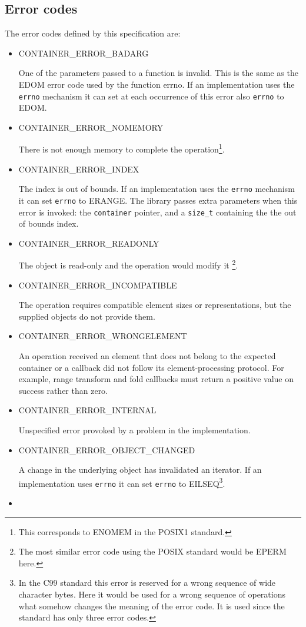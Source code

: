 \documentclass[12pt,a4paper,openany]{memoir} %
\newif\iftth
\newcommand{\doerror}[1]{%
\par\noindent
\iftth
{CONTAINER\_ERROR\_#1}
\else
{\footnotesize CONTAINER\_ERROR\_#1}
\fi
}
\begin{document}
\subsection{Error codes}
\label{errorcodes} 
The error codes defined by this specification are:
\begin{itemize}
\item
\doerror{BADARG} One of the parameters passed to a function is invalid. This is the same as the {\footnotesize EDOM} error code used by the function errno. If an implementation uses the \texttt{errno} mechanism it can set at each occurrence of this error also \texttt{errno} to {\footnotesize EDOM}.
\item
\doerror{NOMEMORY} There is not enough memory to complete the operation\footnote{This corresponds to ENOMEM in the POSIX1 standard.}.
\item
\doerror{INDEX} The index is out of bounds. If an implementation uses the \texttt{errno} mechanism it can set \texttt{errno} to {\footnotesize ERANGE}.
The library passes extra parameters when this error is invoked: the \verb,container, pointer, and a \verb,size_t, containing the
the out of bounds index.
\item
\doerror{READONLY} The object is read-only and the operation would modify it \footnote{The most similar error code using the POSIX standard would be {\footnotesize EPERM} here.}.
\item
\doerror{INCOMPATIBLE} The operation requires compatible element sizes or representations, but the supplied objects do not provide them.
\item
\doerror{WRONGELEMENT} An operation received an element that does not belong to the expected container or a callback did not follow its element-processing protocol. For example, range transform and fold callbacks must return a positive value on success rather than zero.
\item
\doerror{INTERNAL} Unspecified error provoked by a problem in the implementation.
\item
\doerror{OBJECT\_CHANGED} A change in the underlying object has invalidated an iterator. If an implementation uses \texttt{errno} it can set 
\texttt{errno} to {\footnotesize EILSEQ}\footnote{In the C99 standard this error is reserved for a wrong sequence of wide character bytes. Here it would 
be used for a wrong sequence of operations what somehow changes the meaning of the error code. It is used since the standard has only three error 
codes.}.
\item

\end{itemize}
\end{document}
